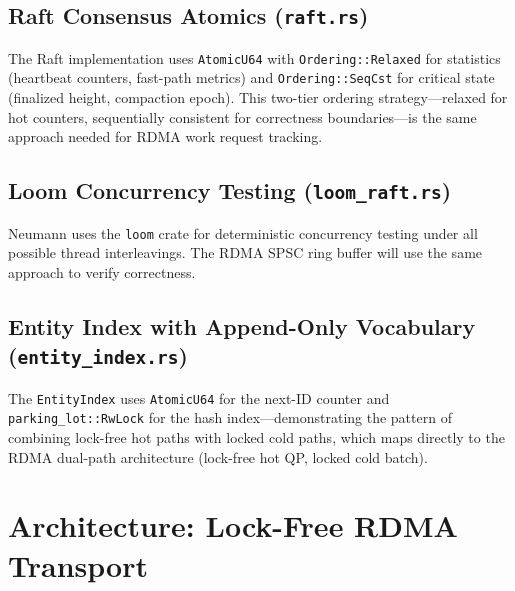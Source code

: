\documentclass[11pt,letterpaper]{article}
\begin{document}
\subsection{Raft Consensus Atomics (\texttt{raft.rs})}

The Raft implementation uses \texttt{AtomicU64} with \texttt{Ordering::Relaxed} for statistics (heartbeat counters, fast-path metrics) and \texttt{Ordering::SeqCst} for critical state (finalized height, compaction epoch). This two-tier ordering strategy---relaxed for hot counters, sequentially consistent for correctness boundaries---is the same approach needed for RDMA work request tracking.

\subsection{Loom Concurrency Testing (\texttt{loom\_raft.rs})}

Neumann uses the \texttt{loom} crate for deterministic concurrency testing under all possible thread interleavings. The RDMA SPSC ring buffer will use the same approach to verify correctness.

\subsection{Entity Index with Append-Only Vocabulary (\texttt{entity\_index.rs})}

The \texttt{EntityIndex} uses \texttt{AtomicU64} for the next-ID counter and \texttt{parking\_lot::RwLock} for the hash index---demonstrating the pattern of combining lock-free hot paths with locked cold paths, which maps directly to the RDMA dual-path architecture (lock-free hot QP, locked cold batch).

\section{Architecture: Lock-Free RDMA Transport}
\end{document}
